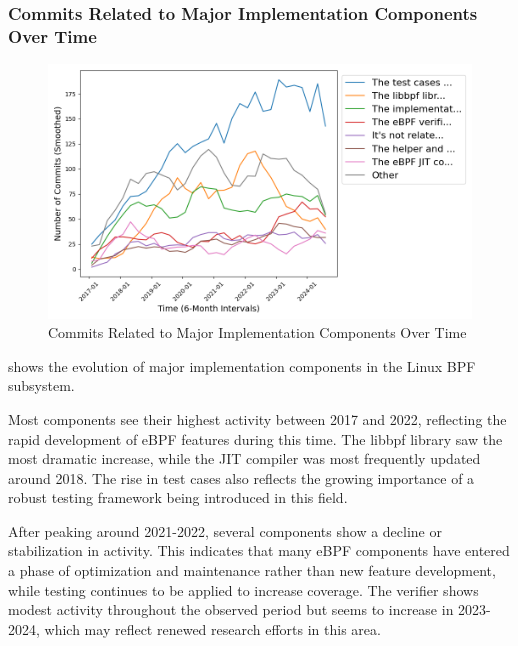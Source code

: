 \subsubsection{Commits Related to Major Implementation Components Over Time}
\begin{figure}[ht]
    \centering
    \includegraphics[width=\linewidth]{feature-analysis/timeline_major_related_implementation_component_smoothed.png}
    \caption{Commits Related to Major Implementation Components Over Time}\label{fig:timeline_major_related_implementation_component_smoothed}
\end{figure}

 shows the evolution of major implementation components in the Linux BPF subsystem.

Most components see their highest activity between 2017 and 2022, reflecting the rapid development of eBPF features during this time. The libbpf library saw the most dramatic increase, while the JIT compiler was most frequently updated around 2018. The rise in test cases also reflects the growing importance of a robust testing framework being introduced in this field.

After peaking around 2021-2022, several components show a decline or stabilization in activity. This indicates that many eBPF components have entered a phase of optimization and maintenance rather than new feature development, while testing continues to be applied to increase coverage. The verifier shows modest activity throughout the observed period but seems to increase in 2023-2024, which may reflect renewed research efforts in this area.
 
